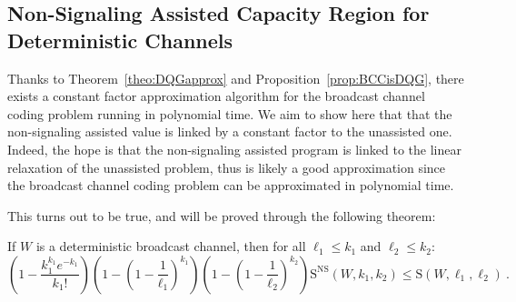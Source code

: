 \subsection{Non-Signaling Assisted Capacity Region for Deterministic Channels}
Thanks to Theorem~\ref{theo:DQGapprox} and Proposition~\ref{prop:BCCisDQG}, there exists a constant factor approximation algorithm for the broadcast channel coding problem running in polynomial time. We aim to show here that that the non-signaling assisted value is linked by a constant factor to the unassisted one. Indeed, the hope is that the non-signaling assisted program is linked to the linear relaxation of the unassisted problem, thus is likely a good approximation since the broadcast channel coding problem can be approximated in polynomial time.

This turns out to be true, and will be proved through the following theorem:

\begin{theorem}
  \label{theo:NSdet}
  If $W$ is a deterministic broadcast channel, then for all $\ell_1 \leq k_1$ and $\ell_2 \leq k_2$:
  \[ \left(1 - \frac{k_1^{k_1}e^{-k_1}}{k_1!}\right)\left(1-\left(1-\frac{1}{\ell_1}\right)^{k_1}\right)\left(1-\left(1-\frac{1}{\ell_2}\right)^{k_2}\right)\mathrm{S}^{\mathrm{NS}}(W,k_1,k_2) \leq \mathrm{S}(W,\ell_1,\ell_2)\ . \]
\end{theorem}


